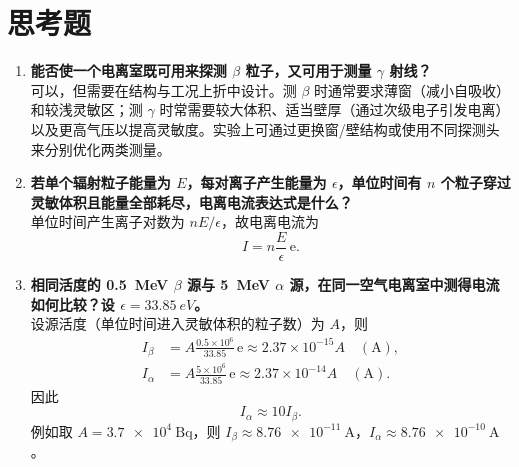 \documentclass[12pt,a4paper]{article}
\begin{document}
\section{思考题}
\begin{enumerate}
    \item \textbf{能否使一个电离室既可用来探测 $\beta$ 粒子，又可用于测量 $\gamma$ 射线？}\\
    可以，但需要在结构与工况上折中设计。测 $\beta$ 时通常要求薄窗（减小自吸收）和较浅灵敏区；测 $\gamma$ 时常需要较大体积、适当壁厚（通过次级电子引发电离）以及更高气压以提高灵敏度。实验上可通过更换窗/壁结构或使用不同探测头来分别优化两类测量。

    \item \textbf{若单个辐射粒子能量为 $E$，每对离子产生能量为 $\epsilon$，单位时间有 $n$ 个粒子穿过灵敏体积且能量全部耗尽，电离电流表达式是什么？}\\
    单位时间产生离子对数为 $nE/\epsilon$，故电离电流为
    \begin{equation}
        I = n\frac{E}{\epsilon}\,\mathrm{e}.
    \end{equation}

    \item \textbf{相同活度的 \SI{0.5}{MeV} $\beta$ 源与 \SI{5}{MeV} $\alpha$ 源，在同一空气电离室中测得电流如何比较？设 $\epsilon=\SI{33.85}{eV}$。}\\
    设源活度（单位时间进入灵敏体积的粒子数）为 $A$，则
    \begin{align}
        I_{\beta} &= A\frac{0.5\times10^6}{33.85}\,\mathrm{e}
        \approx 2.37\times10^{-15}A\quad (\si{\ampere}),\\
        I_{\alpha} &= A\frac{5\times10^6}{33.85}\,\mathrm{e}
        \approx 2.37\times10^{-14}A\quad (\si{\ampere}).
    \end{align}
    因此
    \begin{equation}
        I_{\alpha} \approx 10 I_{\beta}.
    \end{equation}
    例如取 $A=\SI{3.7e4}{\becquerel}$，则 $I_{\beta}\approx\SI{8.76e-11}{\ampere}$，$I_{\alpha}\approx\SI{8.76e-10}{\ampere}$。
\end{enumerate}
\end{document}
